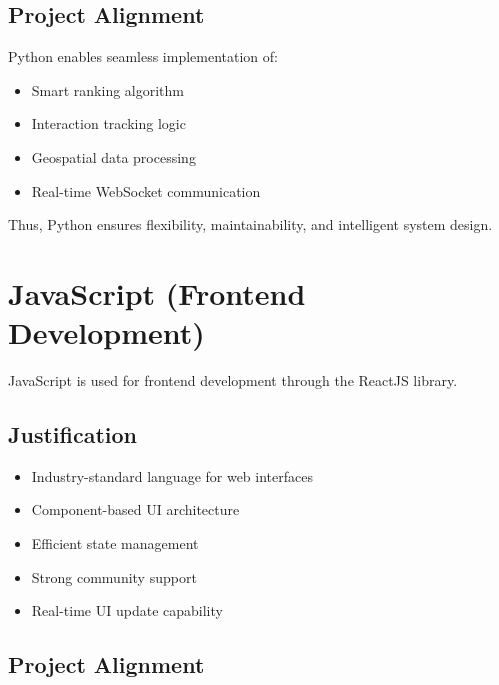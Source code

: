 \documentclass[12pt,a4paper]{report}
\begin{document}
\subsection*{Project Alignment}

Python enables seamless implementation of:

\begin{itemize}

\item Smart ranking algorithm

\item Interaction tracking logic

\item Geospatial data processing

\item Real-time WebSocket communication

\end{itemize}

Thus, Python ensures flexibility, maintainability, and intelligent system design.

\section{JavaScript (Frontend Development)}

JavaScript is used for frontend development through the ReactJS library.

\subsection*{Justification}

\begin{itemize}

\item Industry-standard language for web interfaces

\item Component-based UI architecture

\item Efficient state management

\item Strong community support

\item Real-time UI update capability

\end{itemize}

\subsection*{Project Alignment}
\end{document}
